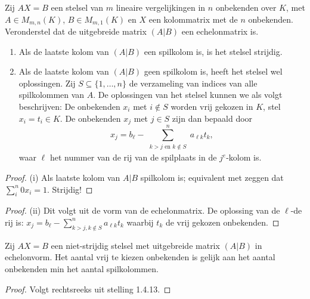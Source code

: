 \begin{stelling}[1.4.13]
    Zij $AX = B$ een stelsel van $m$ lineaire vergelijkingen in $n$ onbekenden over $K$, met $A \in M_{m,n}(K)$, $B \in M_{m,1}(K)$ en $X$ een kolommatrix met de $n$ onbekenden. Veronderstel dat de uitgebreide matrix $(A|B)$ een echelonmatrix is.
    \begin{enumerate}
        \item[(i)] Als de laatste kolom van $(A|B)$ een spilkolom is, is het stelsel strijdig.
        \item[(ii)] Als de laatste kolom van $(A|B)$ geen spilkolom is, heeft het stelsel wel oplossingen. Zij $S \subseteq \{1, \dots, n\}$ de verzameling van indices van alle spilkolommen van $A$. De oplossingen van het stelsel kunnen we als volgt beschrijven:
        De onbekenden $x_i$ met $i \notin S$ worden vrij gekozen in $K$, stel $x_i = t_i \in K$. De onbekenden $x_j$ met $j \in S$ zijn dan bepaald door
        \[ x_j = b_\ell - \sum_{\substack{k > j \text{ en } k \notin S}}^{n} a_{\ell k} t_k, \tag{*} \]
        waar $\ell$ het nummer van de rij van de spilplaats in de $j^e$-kolom is.
    \end{enumerate}
\end{stelling}
\begin{proof}(i)
    Als laatste kolom van \(A|B\) spilkolom is; equivalent met zeggen dat \(\sum_{i}^{n}0 x_i=1\). Strijdig!
\end{proof}
\begin{proof}(ii)
    Dit volgt uit de vorm van de echelonmatrix. De oplossing van de \(\ell\)-de rij is: \(x_j = b_\ell - \sum_{k>j, k \notin S}^{n} a_{\ell k}t_k\) waarbij \(t_k\) de vrij gekozen onbekenden.
\end{proof}

\begin{gevolg}[1.4.14]
    Zij $AX = B$ een niet-strijdig stelsel met uitgebreide matrix $(A|B)$ in echelonvorm. Het aantal vrij te kiezen onbekenden is gelijk aan het aantal onbekenden min het aantal spilkolommen.
\end{gevolg}
\begin{proof}
    Volgt rechtsreeks uit stelling 1.4.13.
\end{proof}